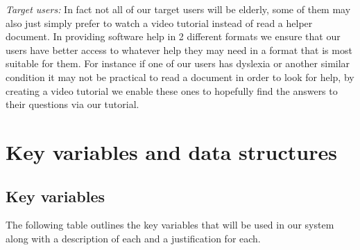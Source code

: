 \textit{Target users:}
In fact not all of our target users will be elderly, some of
them may also just simply prefer to watch a video tutorial instead
of read a helper document. In providing software help in 2 different
formats we ensure that our users have better access to whatever
help they may need in a format that is most suitable for them. For
instance if one of our users has dyslexia or another similar condition
it may not be practical to read a document in order to look for help,
by creating a video tutorial we enable these ones to hopefully find
the answers to their questions via our tutorial.
\\ \vspace{0.2cm}

\section{Key variables and data structures}

\subsection{Key variables}

The following table outlines the key variables that will
be used in our system along with a description of each and a
justification for each.

